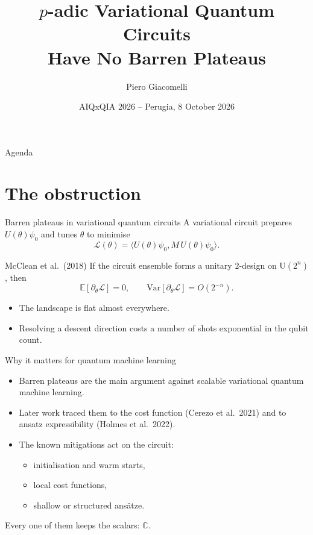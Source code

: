 \documentclass[aspectratio=169,compress]{beamer}
\title[No Barren Plateaus over $\Qp$]{$p$-adic Variational Quantum Circuits\\
  Have No Barren Plateaus}
\author[P. Giacomelli]{Piero Giacomelli}
\institute[Tenax SPA]{Tenax SPA, Verona, Italy}
\date[AIQxQIA 2026]{AIQxQIA 2026 -- Perugia, 8 October 2026}
\newcommand{\Uni}{\mathrm{U}}
\newcommand{\loss}{\mathcal{L}}
\newcommand{\inner}[2]{\langle #1, #2\rangle}
\begin{document}
\begin{frame}
  \titlepage
\end{frame}

\begin{frame}{Agenda}
  \tableofcontents
\end{frame}

\section[Obstruction]{The obstruction}

\begin{frame}{Barren plateaus in variational quantum circuits}
  A variational circuit prepares $U(\theta)\psi_0$ and tunes $\theta$ to
  minimise
  \[
    \loss(\theta)=\inner{U(\theta)\psi_0}{M\,U(\theta)\psi_0}.
  \]
  \begin{block}{McClean et al.\ (2018)}
    If the circuit ensemble forms a unitary $2$-design on $\Uni(2^{n})$, then
    \[
      \mathbb{E}[\partial_\theta\loss]=0,
      \qquad
      \mathrm{Var}[\partial_\theta\loss]=O(2^{-n}).
    \]
  \end{block}
  \begin{itemize}
    \item The landscape is flat almost everywhere.
    \item Resolving a descent direction costs a number of shots exponential in
      the qubit count.
  \end{itemize}
\end{frame}

\begin{frame}{Why it matters for quantum machine learning}
  \begin{itemize}
    \item Barren plateaus are the main argument against \alert{scalable}
      variational quantum machine learning.
    \item Later work traced them to the cost function (Cerezo et al.\ 2021) and
      to ansatz expressibility (Holmes et al.\ 2022).
    \item The known mitigations act on the \alert{circuit}:
      \begin{itemize}
        \item initialisation and warm starts,
        \item local cost functions,
        \item shallow or structured ans\"atze.
      \end{itemize}
  \end{itemize}
  \vspace{0.6em}
  \begin{center}
    Every one of them keeps the scalars: $\mathbb{C}$.
  \end{center}
\end{frame}
\end{document}
